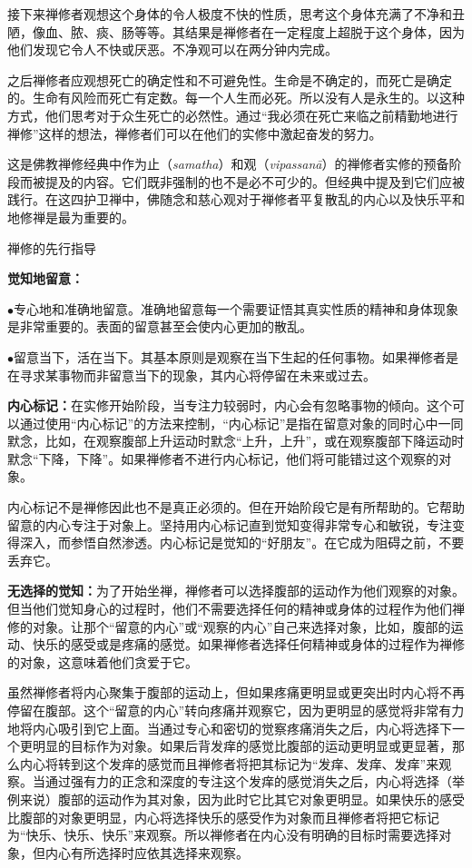 接下来禅修者观想这个\1身体的令人极度不快的性质，思考这个身体充满了不净和丑陋，像血、脓、痰、肠等等。其结果是禅修者在一定程度上超脱于这个身体，因为他们发现它令人不快或厌恶。不净观可以在两分钟内完成。

之后禅修者应观想死亡的确定性和不可避免性。生命是不确定的，而死亡是确定的。生命有风险而死亡有定数。每一个人生而必死。所以没有人是永生的。以这种方式，他们思考对于众生死亡的必然性。通过“我必须在死亡来临之前精勤地进行禅修”这样的想法，禅修者们可以在他们的实修中激起奋发的努力。

这是佛教禅修经典中作为止（{\it samatha}）和观（{\it vipassan\=a}）的禅修者实修的预备阶段而被提及的内容。它们既非强制的也不是必不可少的。但经典中提及到它们应被践行。在这四护卫禅中，佛随念和慈心观对于禅修者平复散乱的内心以及快乐平和地修禅是最为重要的。

\sssubsectnonb 禅修的先行指导

{\bf 觉知地留意：}

$\bullet$专心地和准确地留意。准确地留意每一个需要证悟其真实性质的精神和身体现象是非常重要的。表面的留意甚至会使内心更加的散乱。

$\bullet$留意当下，活在当下。其基本原则是观察\1在当下生起的任何事物。如果禅修者是在寻求某事物而非留意当下的现象，其内心将停留在未来或过去。


{\bf 内心标记：}在实修开始阶段，当专注力较弱时，内心会有忽略事物的倾向。这个可以通过使用“内心标记”的方法来控制，“内心标记”是指在留意对象的同时心中一同默念，比如，在观察腹部上升运动时默念“上升，上升”，或在观察腹部下降运动时默念“下降，下降”。如果禅修者不进行内心标记，他们将可能错过这个观察的对象。

内心标记不是禅修因此也不是真正必须的。但在开始阶段它是有所帮助的。它帮助留意的内心专注于对象上。坚持用内心标记直到觉知变得非常专心和敏锐，专注变得深入，而参悟自然渗透。内心标记是觉知的“好朋友”。在它成为阻碍之前，不要丢弃它。

{\bf 无选择的觉知：}为了开始坐禅，禅修者可以选择腹部的运动作为他们观察的对象。但当他们觉知身心的过程时，他们不需要选择任何的精神或身体的过程作为他们禅修的对象。让那个“留意的内心”或“观察的内心”自己来选择对象，比如，腹部的运动、快乐的感受或是疼痛的感觉。如果禅修者选择任何精神或身体的过程作为禅修的对象，这意味着他们贪爱于它。

\1虽然禅修者将内心聚集于腹部的运动上，但如果疼痛更明显或更突出时内心将不再停留在腹部。这个“留意的内心”转向疼痛并观察它，因为更明显的感觉将非常有力地将内心吸引到它上面。当通过专心和密切的觉察疼痛消失之后，内心将选择下一个更明显的目标作为对象。如果后背发痒的感觉比腹部的运动更明显或更显著，那么内心将转到这个发痒的感觉而且禅修者将把其标记为“发痒、发痒、发痒”来观察。当通过强有力的正念和深度的专注这个发痒的感觉消失之后，内心将选择（举例来说）腹部的运动作为其对象，因为此时它比其它对象更明显。如果快乐的感受比腹部的对象更明显，内心将选择快乐的感受作为对象而且禅修者将把它标记为“快乐、快乐、快乐”来观察。所以禅修者在内心没有明确的目标时需要选择对象，但内心有所选择时应依其选择来观察。


